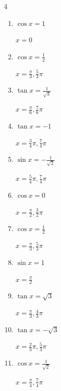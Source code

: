 \begin{multicols}{4}
\begin{enumerate}
        $\displaystyle x = \frac{\pi}{6} , \frac{7}{6}\pi$

  \item $\displaystyle \cos{x}  = 1$

        $\displaystyle x = 0$

  \item $\displaystyle \cos{x}  = \frac{1}{2}$

        $\displaystyle x = \frac{\pi}{3} , \frac{5}{3}\pi$

  \item $\displaystyle \tan{x}  = \frac{1}{\sqrt{3}}$

        $\displaystyle x = \frac{\pi}{6} , \frac{7}{6}\pi$

  \item $\displaystyle \tan{x}  = -1$

        $\displaystyle x = \frac{3}{4}\pi , \frac{7}{4}\pi$

  \item $\displaystyle \sin{x}  = -\frac{1}{\sqrt{2}}$

        $\displaystyle x = \frac{5}{4}\pi , \frac{7}{4}\pi$

  \item $\displaystyle \cos{x}  = 0$

        $\displaystyle x = \frac{\pi}{2} , \frac{3}{2}\pi$

  \item $\displaystyle \cos{x}  = \frac{1}{2}$

        $\displaystyle x = \frac{\pi}{3} , \frac{5}{3}\pi$

\columnbreak %

  \item $\displaystyle \sin{x}  = 1$

        $\displaystyle x = \frac{\pi}{2}$

  \item $\displaystyle \tan{x}  = \sqrt{3}$

        $\displaystyle x = \frac{\pi}{3} , \frac{4}{3}\pi$

  \item $\displaystyle \tan{x}  = -\sqrt{3}$

        $\displaystyle x = \frac{2}{3}\pi , \frac{5}{3}\pi$

  \item $\displaystyle \cos{x}  = \frac{1}{\sqrt{2}}$

        $\displaystyle x = \frac{\pi}{4} , \frac{7}{4}\pi$


\end{enumerate}
\end{multicols}
